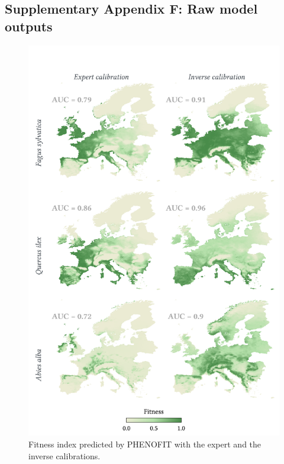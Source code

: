 \newpage

\subsection{Supplementary Appendix F: Raw model outputs}\label{chap1:appendixF}






\begin{figure}[ht!]
\centering 
\includegraphics{chapter1/figs/supp/phenofit_output_maps}
\caption{Fitness index predicted by PHENOFIT with the expert and the inverse calibrations.}\label{fig:phenofit_output_maps}
\end{figure}

